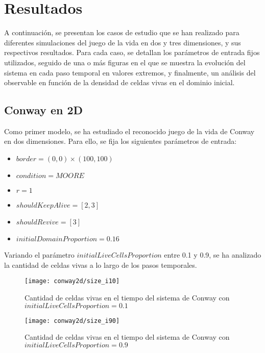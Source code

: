 \section{Resultados}\label{sec:resultados}
A continuación, se presentan los casos de estudio que se han realizado para diferentes simulaciones del juego
de la vida en dos y tres dimensiones, y sus respectivos resultados.
Para cada caso, se detallan los parámetros de entrada fijos utilizados, seguido de una o más figuras en el que
se muestra la evolución del sistema en cada paso temporal en valores extremos, y finalmente, un análisis del
observable en función de la densidad de celdas vivas en el dominio inicial.

\subsection{Conway en 2D}\label{subsec:conway-en-2d}

Como primer modelo, se ha estudiado el reconocido juego de la vida de Conway en dos dimensiones.
Para ello, se fija los siguientes parámetros de entrada:

\begin{itemize}
    \item $border = (0, 0) \times (100, 100)$
    \item $condition = MOORE$
    \item $r = 1$
    \item $shouldKeepAlive = [2, 3]$
    \item $shouldRevive = [3]$
    \item $initialDomainProportion = 0.16$
\end{itemize}

Variando el parámetro $initialLiveCellsProportion$ entre 0.1 y 0.9, se ha analizado la cantidad de celdas vivas
a lo largo de los pasos temporales.

\begin{figure}[H]
    \centering
    \texttt{[image: conway2d/size\_i10]}
    \caption{Cantidad de celdas vivas en el tiempo del sistema de Conway con $initialLiveCellsProportion = 0.1$}
    \label{fig:conway2d_i10}
\end{figure}
\begin{figure}[H]
    \centering
    \texttt{[image: conway2d/size\_i90]}
    \caption{Cantidad de celdas vivas en el tiempo del sistema de Conway con $initialLiveCellsProportion = 0.9$}
    \label{fig:conway2d_i90}
\end{figure}

